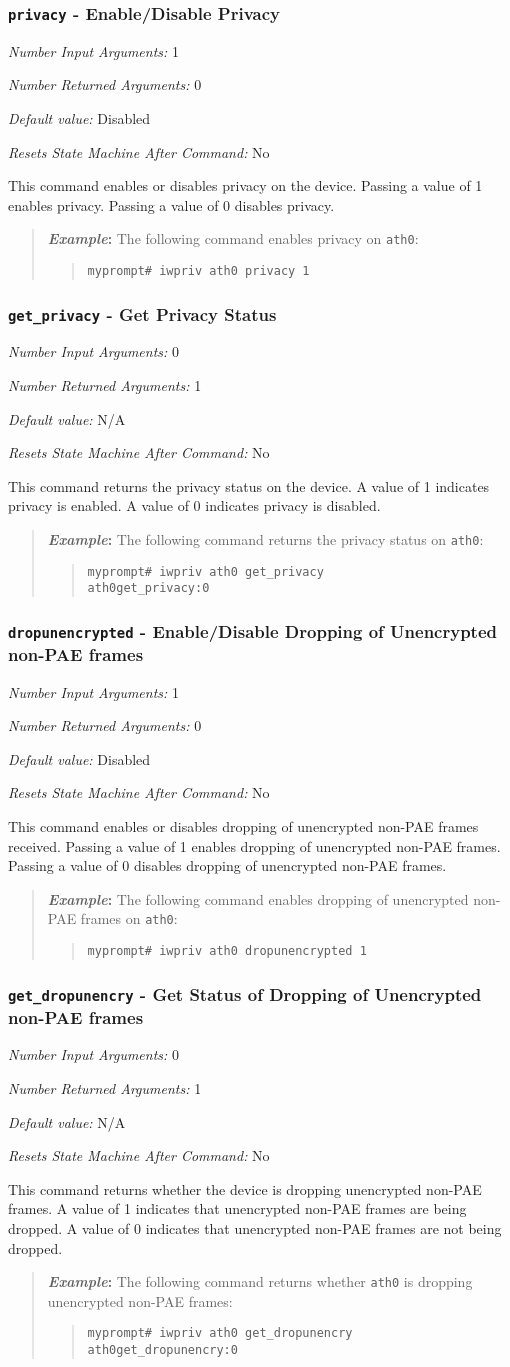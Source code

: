 \documentclass[10pt,fullpage]{article}
\newcommand{\mytt}[1]{{\texttt{#1}}}
\newcommand{\bv}{\begin{verse}}
\newcommand{\ev}{\end{verse}}
\newcommand{\cmd}[1]{{\texttt{myprompt\# #1}}}
\newcommand{\argdesc}[4]{\begin{description}
\itemsep -6pt
\item \textit{Number Input Arguments:} #1
\item \textit{Number Returned Arguments:} #2
\item \textit{Default value:} #3
\item \textit{Resets State Machine After Command:} #4
\end{description}
}
\newenvironment{example}{\begin{quote}\textbf{\textit{Example}:}}{\end{quote}}
\begin{document}
\subsubsection{\mytt{privacy} - Enable/Disable Privacy}
\argdesc{1}{0}{Disabled}{No}
This command enables or disables privacy on the device.  Passing a
value of 1 enables privacy. Passing a value of 0 disables privacy.
\begin{example}
  The following command enables privacy on \mytt{ath0}:
  \bv
  \cmd{iwpriv ath0 privacy 1}
  \ev
\end{example}

\subsubsection{\mytt{get\_privacy} - Get Privacy Status}
\argdesc{0}{1}{N/A}{No}
This command returns the privacy status on the device.  A value of 1
indicates privacy is enabled. A value of 0 indicates privacy is
disabled.
\begin{example}
  The following command returns the privacy status on \mytt{ath0}:
  \bv
  \cmd{iwpriv ath0 get\_privacy}\\
  \mytt{ath0\hspace{32pt}get\_privacy:0}
  \ev
\end{example}

\subsubsection{\mytt{dropunencrypted} - Enable/Disable Dropping of
  Unencrypted non-PAE frames}
\argdesc{1}{0}{Disabled}{No}
This command enables or disables dropping of unencrypted non-PAE
frames received.  Passing a value of 1 enables dropping of unencrypted
non-PAE frames.  Passing a value of 0 disables dropping of unencrypted
non-PAE frames.
\begin{example}
  The following command enables dropping of unencrypted non-PAE frames
  on \mytt{ath0}:
  \bv
  \cmd{iwpriv ath0 dropunencrypted 1}
  \ev
\end{example}

\subsubsection{\mytt{get\_dropunencry} - Get Status of Dropping of
  Unencrypted non-PAE frames}
\argdesc{0}{1}{N/A}{No}
This command returns whether the device is dropping unencrypted
non-PAE frames.  A value of 1 indicates that unencrypted non-PAE
frames are being dropped.  A value of 0 indicates that unencrypted
non-PAE frames are not being dropped.
\begin{example}
  The following command returns whether \mytt{ath0} is dropping
  unencrypted non-PAE frames:
  \bv
  \cmd{iwpriv ath0 get\_dropunencry}\\
  \mytt{ath0\hspace{32pt}get\_dropunencry:0}
  \ev
\end{example}
\end{document}

